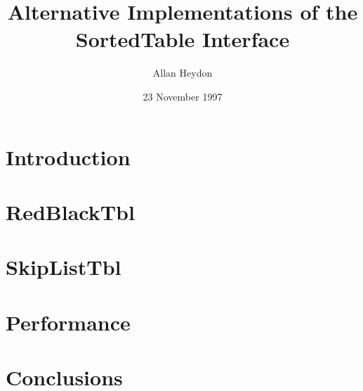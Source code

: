 \documentclass{article}
\begin{document}


\title{Alternative Implementations of the SortedTable Interface}
\author{Allan Heydon}
\date{23 November 1997}
\maketitle

\section{Introduction}


\section{RedBlackTbl}


\section{SkipListTbl}


\section{Performance}


\section{Conclusions}



\end{document}
